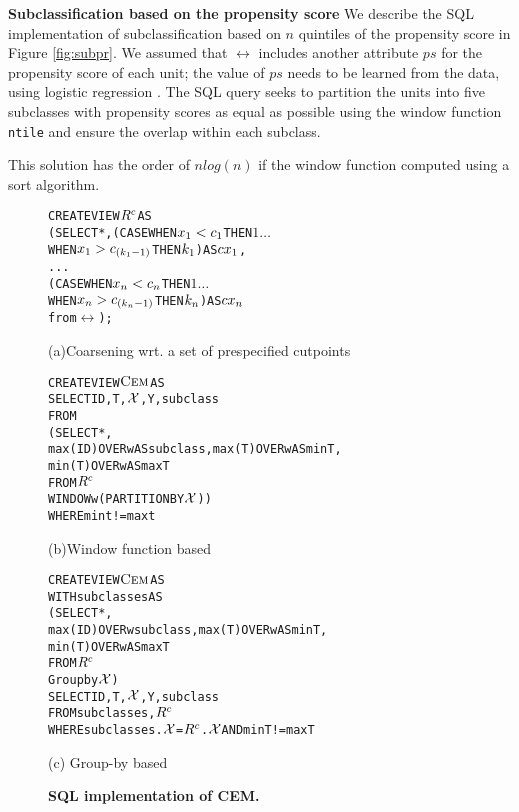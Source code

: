 {\bf Subclassification based on the propensity score} We describe the
SQL implementation of subclassification based on $n$ quintiles of the
propensity score in Figure \ref{fig:subpr}.  We assumed that $\rel$
includes another attribute $ps$ for the propensity score of each unit;
the value of $ps$ needs to be learned from the data, using logistic
regression \cite{Rubin1983b}.  The SQL query seeks to partition
the units into five subclasses with propensity scores as equal as
possible using the window function {\verb|ntile|} and ensure the overlap within each subclass.  This solution has the order of $nlog(n)$ if the window
function computed using a sort algorithm.







\begin{figure}
\begin{alltt} \scriptsize
CREATE VIEW \(\crele\) AS
(SELECT *, (CASE WHEN \(x\sb{1}<c\sb{1}\)  THEN \(1 \ldots\)
                 WHEN \(x\sb{1}>c\sb{(k\sb{1}-1)}\) THEN \(k\sb{1}\)) AS \(cx\sb{1}\),
              . . .
           (CASE WHEN \(x\sb{n}<c\sb{n}\)  THEN \(1 \ldots\)
                 WHEN \(x\sb{n}>c\sb{(k\sb{n}-1)}\) THEN \(k\sb{n}\)) AS \(cx\sb{n}\)
from \(\rel\));
\end{alltt} \vspace{-.2cm} \hspace{0.7cm}
{(a)Coarsening wrt. a set of prespecified cutpoints}
\vspace{-.3cm}
\begin{alltt} \scriptsize
CREATE VIEW \(\cem\) AS
SELECT ID, T, \(\ccv\), Y, subclass
FROM
  (SELECT *,
          max(ID) OVER w AS subclass, max(T) OVER w AS minT,
          min(T) OVER w AS maxT
   FROM \(\crele\)
   WINDOW w (PARTITION BY \(\ccv\)))
WHERE mint!=maxt
\end{alltt}\vspace{-.2cm} \hspace{2.5cm}
(b)Window function based
\vspace{-.3cm}
\begin{alltt} \scriptsize
CREATE VIEW \(\cem\) AS
WITH subclasses AS
  (SELECT *,
          max(ID) OVER w subclass, max(T) OVER w AS minT,
          min(T) OVER w AS maxT
   FROM \(\crele\)
   Group by \(\ccv\))
SELECT ID, T, \(\ccv\), Y, subclass
FROM subclasses,\(\crele\)
WHERE subclasses.\(\ccv\)=\(\crele\).\(\ccv\)  AND  minT!=maxT

\end{alltt}\vspace{-.2cm}\hspace{2.5cm}
(c) Group-by based
\vspace{-.1cm}
  \caption{\bf{SQL implementation of CEM.}}\label{fig:cem}
\end{figure}


